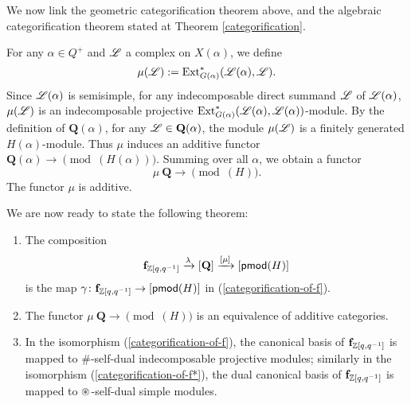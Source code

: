We now link the geometric categorification theorem above,
and the algebraic categorification theorem stated at Theorem \ref{categorification}.

For any $\alpha\in Q^+$ and $\mathscr{L}$ a complex on $X(\alpha)$,
we define 
\[
    \mu(\mathscr{L}) := \operatorname{Ext}^*_{G(\alpha)}(\mathscr{L}(\alpha),\mathscr{L}).
\]
Since $\mathscr{L}(\alpha)$ is semisimple, for any indecomposable
direct summand $\mathscr{L}$ of $\mathscr{L}(\alpha)$, $\mu(\mathscr{L})$ is an
indecomposable projective $\operatorname{Ext}^*_{G(\alpha)}(\mathscr{L}(\alpha),\mathscr{L}(\alpha))$-module.
By the definition of $\mathbf{Q}(\alpha)$, for any
$\mathscr{L}\in\mathbf{Q}(\alpha)$, the module $\mu(\mathscr{L})$ is a
finitely generated $H(\alpha)$-module. Thus $\mu$
induces an additive functor $\mathbf{Q}(\alpha)
\to\pmod(H(\alpha))$. Summing over all $\alpha$,
we obtain a functor $$\mu\:\mathbf{Q}\to\pmod(H).$$
The functor $\mu$ is additive.

We are now ready to state the following theorem:

\begin{theorem}[{\cite[Theorem 4.4]{VV}}]\label{canonical-basis}
    \begin{enumerate}[1)]
        \item The composition $$\mathbf{f}_{\mathbb{Z}[q,q^{-1}]}
        \xrightarrow{\lambda}[\mathbf{Q}]\xrightarrow{[\mu]}
        [\mathsf{pmod}(H)]$$ is the map $\gamma\colon\mathbf{f}_{\mathbb{Z}[q,q^{-1}]}\to[\mathsf{pmod}(H)]$ in (\ref{categorification-of-f}).

        \item The functor $\mu\:\mathbf{Q}\to\pmod(H)$ is an equivalence of additive categories.
        
        \item In the isomorphism (\ref{categorification-of-f}),
        the canonical basis of $\mathbf{f}_{\mathbb{Z}[q,q^{-1}]}$ is mapped
        to $\#$-self-dual indecomposable projective modules;
        similarly in the isomorphism (\ref{categorification-of-f*}),
        the dual canonical basis of $\mathbf{f}_{\mathbb{Z}[q,q^{-1}]}$ is mapped
        to $\circledast$-self-dual simple modules.
    \end{enumerate}
\end{theorem}

